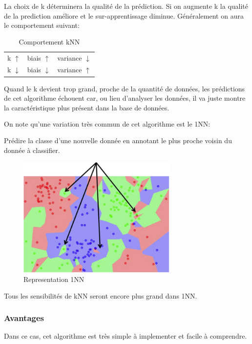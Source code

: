 \documentclass{article}
\begin{document}
La choix de k déterminera la qualité de la prédiction. Si on augmente k la qualité de la prediction améliore et le sur-apprentissage diminue. Généralement on aura le comportement suivant:
\begin{table}[H]
    \centering\begin{tabular}{lll}
        k $\uparrow  $ & biais $\uparrow  $ & variance $\downarrow$\\
        k $\downarrow$ & biais $\downarrow$ & variance $\uparrow$\\
    \end{tabular}
    \caption{Comportement kNN}
\end{table}
\begin{remark}
    Quand le k devient trop grand, proche de la quantité de données, les prédictions de cet algorithme échouent car, ou lieu d'analyser les données, il va juste montre la caractéristique plus présent dans la base de données.
\end{remark}
On note qu'une variation très commun de cet algorithme est le 1NN:
\begin{definition}
    Prédire la classe d'une nouvelle donnée en annotant le plus proche voisin du donnée à classifier.
    \begin{figure}[H]
        \centering
        \includegraphics[height=60mm]{images/1NN_diagram.png}
        \caption{Representation 1NN}
    \end{figure}
\end{definition}
\begin{phrase}
    Tous les sensibilités de kNN seront encore plus grand dans 1NN.
\end{phrase}

\subsubsection{Avantages}
Dans ce cas, cet algorithme	est très simple à implementer et facile à comprendre.
\end{document}
